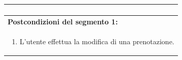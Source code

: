 \documentclass{article}
\begin{document}
\begin{table}[t]
\begin{tabular}{|p{\linewidth}|}
\begin{enumerate}
                        \end{enumerate} \\
                        \hline
                        \cellcolor{gray!20}
                        \textbf{Postcondizioni del segmento 1:} \\
                        \cellcolor{gray!20}
                        \begin{minipage}{\linewidth}
                            \begin{enumerate}[noitemsep]
                                \item L'utente effettua la modifica di una prenotazione.
                            \end{enumerate}
                        \end{minipage} \\
                        \hline
                    \end{tabular}
                \end{table}
\end{document}
